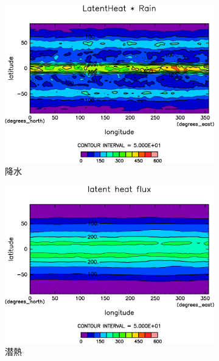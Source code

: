 \documentclass[body]{subfiles}
\begin{document}
\begin{figure}[t]
\begin{subfigure}{.4\textwidth}
		\includegraphics[width=\textwidth]{S1366-nc/Rain,time=3650:4015-crop-rotate.pdf}
		\caption{降水\hmu*{[W/m^{-2}]}}\label{S1366nc降水}
	\end{subfigure}
	\begin{subfigure}{.4\textwidth}
		\centering
		\includegraphics[width=\textwidth]{S1366-nc/Evap,time=3650:4015-crop-rotate.pdf}
		\caption{潜熱\hmu*{[W/m^{-2}]}}\label{S1366nc潜熱}
	\end{subfigure}
	\begin{subfigure}{.4\textwidth}
		\centering

\end{subfigure}
\end{figure}
\end{document}
